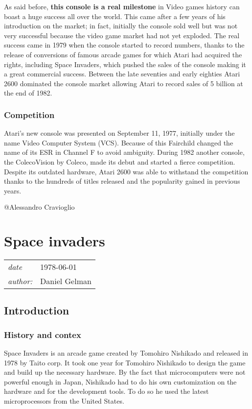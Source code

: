 \documentclass[a4paper,10pt]{book}
\newcommand{\pageHeader}[4]{
    \section{#1}
    \vspace{-0.3cm}
    \begin{table}[h!]
     \begin{tabular}{ll}
        \hline
        \textit{date} & #2 \\
        \textit{author: } & #3\\
        \hline
     \end{tabular}
    \end{table}
    \vspace{-0.3cm}
}
\begin{document}
            As said before,  \textbf{this console is a real milestone }  in Video games history can boast a huge success all over the world.
            This came after a few years of his introduction on the market; in fact, initially the console sold well but was
            not very successful because the video game market had not yet exploded. The real success came in 1979 when the console
            started to record numbers, thanks to the release of conversions of famous arcade games for which Atari had acquired
            the rights, including Space Invaders, which pushed the sales of the console
            making it a great commercial success. Between the late seventies and early eighties Atari 2600 dominated the console market allowing Atari
            to record sales of 5 billion at the end of 1982.
         
 \subsubsection{Competition }
 
            Atari's new console was presented on September 11, 1977, initially under the name Video Computer System (VCS).
            Because of this Fairchild changed the name of its ESR in  Channel F  to avoid ambiguity.
            During 1982 another console, the ColecoVision by Coleco, made its debut and started a fierce competition. Despite its outdated hardware,
            Atari 2600 was able to withstand the competition thanks to the hundreds of titles released and the popularity gained in previous years.
         
 
 @Alessandro Cravioglio 
 
 \newpage\pageHeader{Space invaders}{1978-06-01}{Daniel Gelman}{Space invaders is a 1978 arcade game, this game at the time just created a coin deficit! You can try it here for free}
 \subsection{Introduction }
 \subsubsection{History and contex }
   \textbf{}   \textit{}
 
                Space Invaders is an arcade game created by Tomohiro Nishikado and released in 1978 by Taito corp.   It took one year for Tomohiro Nishikado to design the game and build up the necessary hardware. By the fact that microcomputers were
                not powerful enough in Japan, Nishikado had to do his own customization on the hardware and for the development tools. To do so he used the latest microprocessors from the United States.  
\end{document}
